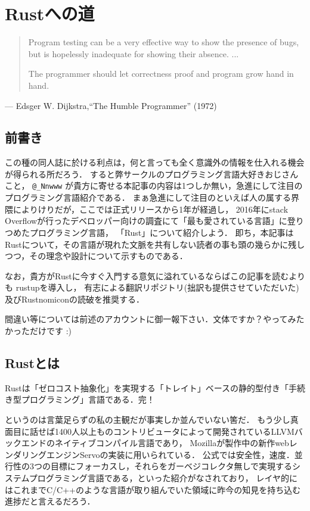 \chapter{Rustへの道}
\begin{quotation}
  Program testing can be a very effective way to show the presence of bugs, \\
  but is hopelessly inadequate for showing their absence. ...

  The programmer should let correctness proof and program grow hand in hand.
\end{quotation}
\begin{flushright}
  --- Edsger W. Dijkstra,``The Humble Programmer'' (1972)
\end{flushright}

\section{前書き}
この種の同人誌に於ける利点は，何と言っても全く意識外の情報を仕入れる機会が得られる所だろう．
すると弊サークルのプログラミング言語大好きおじさんこと， \verb|@_Nnwww| が貴方に寄せる本記事の内容は1つしか無い，急進にして注目のプログラミング言語紹介である．
まぁ急進にして注目のといえば人の属する界隈によりけりだが，ここでは正式リリースから1年が経過し，
2016年にstack Overflowが行ったデベロッパー向けの調査にて「最も愛されている言語」に登りつめたプログラミング言語\cite{most_loved}，
「Rust」について紹介しよう．
即ち，本記事はRustについて，その言語が現れた文脈を共有しない読者の事も頭の幾らかに残しつつ，その理念や設計について示すものである．

なお，貴方がRustに今すぐ入門する意気に溢れているならばこの記事を読むよりも
rustup\cite{rustup}を導入し，
有志による翻訳リポジトリ\cite{rustdoc_ja}(拙訳も提供させていただいた)及びRustnomicon\cite{nomicon}の読破を推奨する．

間違い等については前述のアカウントに御一報下さい．文体ですか？やってみたかっただけです :)

\section{Rustとは}
Rustは「ゼロコスト抽象化」を実現する「トレイト」ベースの静的型付き「手続き型プログラミング」言語である．完！

というのは言葉足らずの私の主観だが事実しか並んでいない筈だ．
もう少し真面目に話せば1400人以上ものコントリビュータによって開発されているLLVMバックエンドのネイティブコンパイル言語であり，
Mozillaが製作中の新作webレンダリングエンジンServoの実装に用いられている．
公式では安全性，速度．並行性の3つの目標にフォーカスし，それらをガーベジコレクタ無しで実現するシステムプログラミング言語である，といった紹介がなされており，
レイヤ的にはこれまでC/C++のような言語が取り組んでいた領域に昨今の知見を持ち込む進捗だと言えるだろう．

